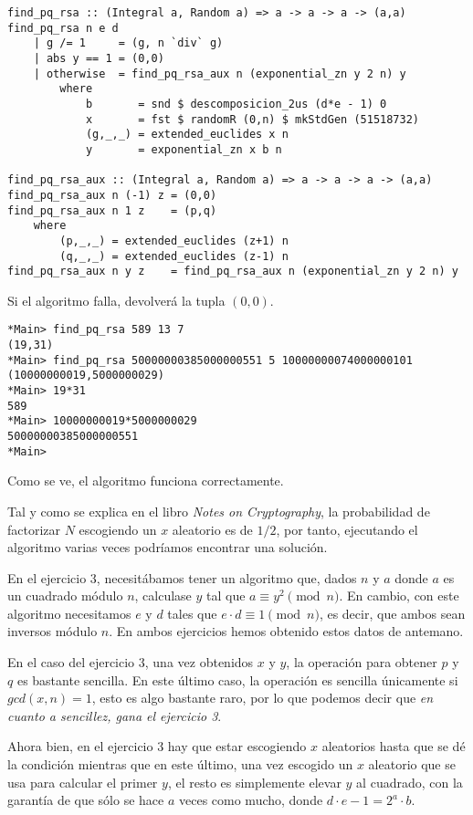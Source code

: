 \documentclass[10pt,spanish]{article}
\begin{document}
\begin{verbatim}
find_pq_rsa :: (Integral a, Random a) => a -> a -> a -> (a,a)
find_pq_rsa n e d
    | g /= 1     = (g, n `div` g)
    | abs y == 1 = (0,0)
    | otherwise  = find_pq_rsa_aux n (exponential_zn y 2 n) y
        where
            b       = snd $ descomposicion_2us (d*e - 1) 0
            x       = fst $ randomR (0,n) $ mkStdGen (51518732)
            (g,_,_) = extended_euclides x n
            y       = exponential_zn x b n

find_pq_rsa_aux :: (Integral a, Random a) => a -> a -> a -> (a,a)
find_pq_rsa_aux n (-1) z = (0,0)
find_pq_rsa_aux n 1 z    = (p,q)
    where
        (p,_,_) = extended_euclides (z+1) n
        (q,_,_) = extended_euclides (z-1) n
find_pq_rsa_aux n y z    = find_pq_rsa_aux n (exponential_zn y 2 n) y 
\end{verbatim}

Si el algoritmo falla, devolverá la tupla $(0,0)$.

\begin{verbatim}
*Main> find_pq_rsa 589 13 7
(19,31)
*Main> find_pq_rsa 50000000385000000551 5 10000000074000000101
(10000000019,5000000029)
*Main> 19*31
589
*Main> 10000000019*5000000029
50000000385000000551
*Main> 
\end{verbatim}

Como se ve, el algoritmo funciona correctamente. 

Tal y como se explica en el libro \textit{\textcolor{azul}{Notes on Cryptography}}, la probabilidad de factorizar $N$ escogiendo un $x$ aleatorio es de $1/2$, por tanto, ejecutando el algoritmo varias veces podríamos encontrar una solución.

En el ejercicio 3, necesitábamos tener un algoritmo que, dados $n$ y $a$ donde $a$ es un cuadrado módulo $n$, calculase $y$ tal que $a \equiv y^2 \pmod n$. En cambio, con este algoritmo necesitamos $e$ y $d$ tales que $e \cdot d \equiv 1 \pmod n$, es decir, que ambos sean inversos módulo $n$. En ambos ejercicios hemos obtenido estos datos de antemano.

En el caso del ejercicio 3, una vez obtenidos $x$ y $y$, la operación para obtener $p$ y $q$ es bastante sencilla. En este último caso, la operación es sencilla únicamente si $gcd(x,n) = 1$, esto es algo bastante raro, por lo que podemos decir que \textit{\textcolor{azul}{en cuanto a sencillez, gana el ejercicio 3}}.

Ahora bien, en el ejercicio 3 hay que estar escogiendo $x$ aleatorios hasta que se dé la condición mientras que en este último, una vez escogido un $x$ aleatorio que se usa para calcular el primer $y$, el resto es simplemente elevar $y$ al cuadrado, con la garantía de que sólo se hace $a$ veces como mucho, donde $d \cdot e - 1 = 2^a \cdot b$.
\end{document}
